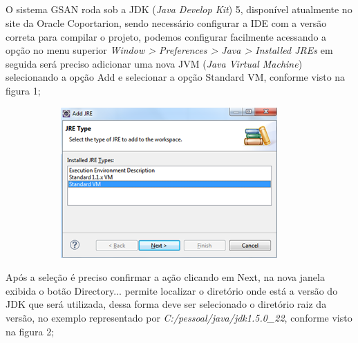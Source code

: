
\begin{apendicesenv}
	
	\partapendices


\chapter{\fontsize{12}{1} }


O sistema GSAN roda sob a JDK (\textit{Java Develop Kit}) 5, disponível atualmente no site da Oracle Coportarion, sendo necessário configurar a IDE com a versão correta para compilar o projeto, podemos configurar facilmente acessando a opção no menu superior \textit{Window > Preferences > Java > Installed JREs} em seguida será preciso adicionar uma nova JVM (\textit{Java Virtual Machine}) selecionando a opção Add e selecionar a opção Standard VM, conforme visto na figura 1;

\begin{figure}[H]
	\centering
	\caption*{\textbf{\fontsize{12}{1}\selectfont{Figura 1 - Selecionar Tipo de JVM.}}}
	\label{figura:anexo1}
	\begin{subfigure}[H]{\textwidth}
		\centering
		\includegraphics{figuras/anexo/selectJVM.png}
	\end{subfigure}
\end{figure}


Após a seleção é preciso confirmar a ação clicando em Next, na nova janela exibida o botão Directory... permite localizar o diretório onde está a versão do JDK que será utilizada, dessa forma deve ser selecionado o diretório raiz da versão, no exemplo representado por \textit{C:/pessoal/java/jdk1.5.0\_22}, conforme visto na figura 2;


\end{apendicesenv}
